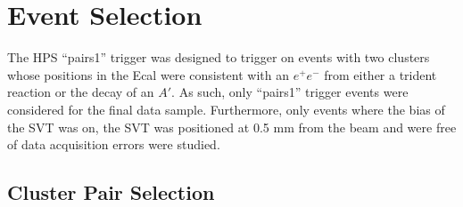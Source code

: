 \section{Event Selection}

The HPS ``pairs1'' trigger was designed to trigger on events with two clusters
whose positions in the Ecal were consistent with an $e^+e^-$ from either a trident 
reaction or the decay of an $A'$. As such, only ``pairs1'' trigger events
were considered for the final data sample.  Furthermore, only events where the
bias of the SVT was on, the SVT was positioned at 0.5 mm from the beam and 
were free of data acquisition errors were studied.

\subsection{Cluster Pair Selection}

